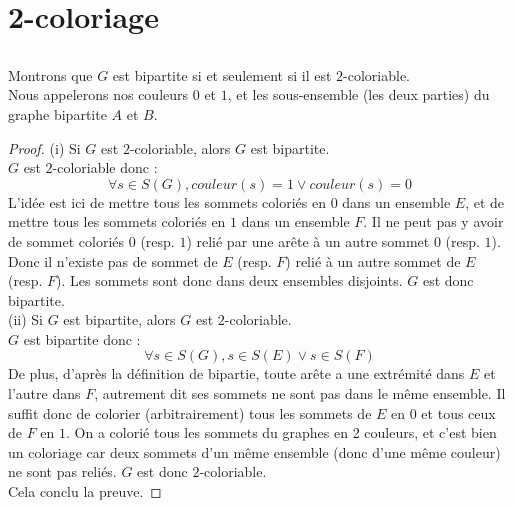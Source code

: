 \section{2-coloriage}
\setcounter{subsection}{4}
\subsection{}
Montrons que $G$ est bipartite si et seulement si il est $2$-coloriable.\\
Nous appelerons nos couleurs $0$ et $1$, et les sous-ensemble (les deux parties) du graphe bipartite $A$ et $B$.
\begin{proof}
    (i) Si $G$ est $2$-coloriable, alors $G$ est bipartite.\\
    $G$ est $2$-coloriable donc : 
    $$
        \forall s \in S(G), couleur(s)=1 \vee couleur(s) = 0
    $$
    L'idée est ici de mettre tous les sommets coloriés en $0$ dans un ensemble $E$, et de mettre tous les sommets coloriés en $1$ dans un ensemble $F$. Il ne peut pas y avoir de sommet coloriés $0$ (resp. $1$) relié par une arête à un autre sommet $0$ (resp. $1$). Donc il n'existe pas de sommet de $E$ (resp. $F$) relié à un autre sommet de $E$ (resp. $F$). Les sommets sont donc dans deux ensembles disjoints. $G$ est donc bipartite.\\
    (ii) Si $G$ est bipartite, alors $G$ est $2$-coloriable.\\
    $G$ est bipartite donc :
    $$
        \forall s \in S(G), s \in S(E) \vee s \in S(F)
    $$
    De plus, d'après la définition de bipartie, toute arête a une extrémité dans $E$ et l'autre dans $F$, autrement dit ses sommets ne sont pas dans le même ensemble. Il suffit donc de colorier (arbitrairement) tous les sommets de $E$ en $0$ et tous ceux de $F$ en $1$. On a colorié tous les sommets du graphes en 2 couleurs, et c'est bien un coloriage car deux sommets d'un même ensemble (donc d'une même couleur) ne sont pas reliés.
    $G$ est donc $2$-coloriable.\\
    Cela conclu la preuve.
\end{proof}

\subsection{}

